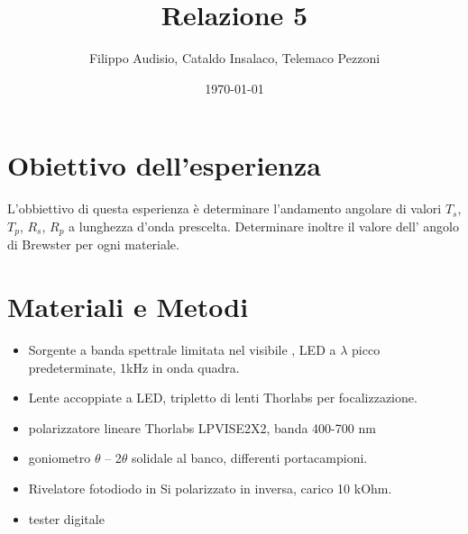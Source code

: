 \documentclass[a4paper,12pt]{article}
\title{\textbf{Relazione 5}}
\author{Filippo Audisio, Cataldo Insalaco, Telemaco Pezzoni}
\date{\today}
\begin{document}
    \maketitle

    \section{Obiettivo dell'esperienza}
    
    L'obbiettivo di questa esperienza è determinare l’andamento angolare di valori $T_s$, $T_p$, $R_s$, $R_p$ a lunghezza d’onda prescelta.
    Determinare inoltre il valore dell’ angolo di Brewster per ogni materiale.
        

    \section{Materiali e Metodi}

      \begin{itemize}
    \item  Sorgente a banda spettrale limitata nel visibile , LED a $\lambda$ picco predeterminate, 1kHz in onda quadra.
    \item  Lente accoppiate a LED, tripletto di lenti Thorlabs per focalizzazione.
    \item  polarizzatore lineare Thorlabs LPVISE2X2, banda 400-700 nm
    \item goniometro $\theta$ – 2$\theta$ solidale al banco, differenti portacampioni.
    \item Rivelatore fotodiodo in Si polarizzato in inversa, carico 10 kOhm.
     \item tester digitale
 \end{itemize}
 
\end{document}
